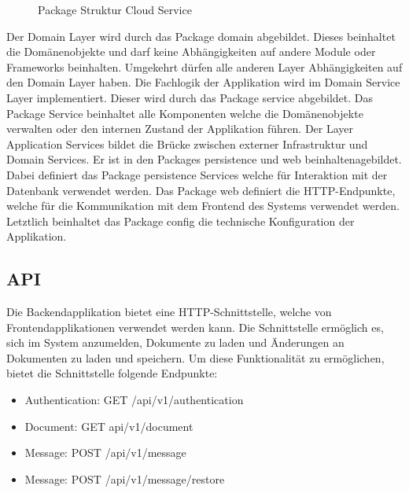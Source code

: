 \begin{figure}[h]
    \centering
    \begin{minipage}[b]{0.9\textwidth}
        \caption{Package Struktur Cloud Service}\label{fig:packagescloudservice}
    \end{minipage}
\end{figure}

Der Domain Layer wird durch das Package domain abgebildet.
Dieses beinhaltet die Domänenobjekte und darf keine Abhängigkeiten auf andere Module oder Frameworks beinhalten.
Umgekehrt dürfen alle anderen Layer Abhängigkeiten auf den Domain Layer haben.
Die Fachlogik der Applikation wird im Domain Service Layer implementiert.
Dieser wird durch das Package service abgebildet.
Das Package Service beinhaltet alle Komponenten welche die Domänenobjekte verwalten oder den internen Zustand der Applikation führen.
Der Layer Application Services bildet die Brücke zwischen externer Infrastruktur und Domain Services.
Er ist in den Packages persistence und web beinhaltenagebildet.
Dabei definiert das Package persistence Services welche für Interaktion mit der Datenbank verwendet werden.
Das Package web definiert die HTTP-Endpunkte, welche für die Kommunikation mit dem Frontend des Systems verwendet werden.
Letztlich beinhaltet das Package config die technische Konfiguration der Applikation.

\clearpage

\subsection{API}

Die Backendapplikation bietet eine HTTP-Schnittstelle, welche von Frontendapplikationen verwendet werden kann.
Die Schnittstelle ermöglich es, sich im System anzumelden, Dokumente zu laden und Änderungen an Dokumenten zu laden und speichern.
Um diese Funktionalität zu ermöglichen, bietet die Schnittstelle folgende Endpunkte:

\begin{itemize}
    \item Authentication: GET  /api/v1/authentication
    \item Document: GET  api/v1/document
    \item Message: POST /api/v1/message
    \item Message: POST /api/v1/message/restore
\end{itemize}

